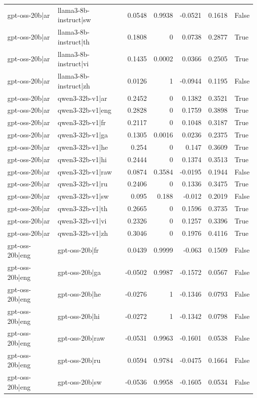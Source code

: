 \begin{table}
\begin{tabular}{l l r r r r l}
gpt-oss-20b|ar & llama3-8b-instruct|sw & 0.0548 & 0.9938 & -0.0521 & 0.1618 & False \\
gpt-oss-20b|ar & llama3-8b-instruct|th & 0.1808 & 0 & 0.0738 & 0.2877 & True \\
gpt-oss-20b|ar & llama3-8b-instruct|vi & 0.1435 & 0.0002 & 0.0366 & 0.2505 & True \\
gpt-oss-20b|ar & llama3-8b-instruct|zh & 0.0126 & 1 & -0.0944 & 0.1195 & False \\
gpt-oss-20b|ar & qwen3-32b-v1|ar & 0.2452 & 0 & 0.1382 & 0.3521 & True \\
gpt-oss-20b|ar & qwen3-32b-v1|eng & 0.2828 & 0 & 0.1759 & 0.3898 & True \\
gpt-oss-20b|ar & qwen3-32b-v1|fr & 0.2117 & 0 & 0.1048 & 0.3187 & True \\
gpt-oss-20b|ar & qwen3-32b-v1|ga & 0.1305 & 0.0016 & 0.0236 & 0.2375 & True \\
gpt-oss-20b|ar & qwen3-32b-v1|he & 0.254 & 0 & 0.147 & 0.3609 & True \\
gpt-oss-20b|ar & qwen3-32b-v1|hi & 0.2444 & 0 & 0.1374 & 0.3513 & True \\
gpt-oss-20b|ar & qwen3-32b-v1|raw & 0.0874 & 0.3584 & -0.0195 & 0.1944 & False \\
gpt-oss-20b|ar & qwen3-32b-v1|ru & 0.2406 & 0 & 0.1336 & 0.3475 & True \\
gpt-oss-20b|ar & qwen3-32b-v1|sw & 0.095 & 0.188 & -0.012 & 0.2019 & False \\
gpt-oss-20b|ar & qwen3-32b-v1|th & 0.2665 & 0 & 0.1596 & 0.3735 & True \\
gpt-oss-20b|ar & qwen3-32b-v1|vi & 0.2326 & 0 & 0.1257 & 0.3396 & True \\
gpt-oss-20b|ar & qwen3-32b-v1|zh & 0.3046 & 0 & 0.1976 & 0.4116 & True \\
gpt-oss-20b|eng & gpt-oss-20b|fr & 0.0439 & 0.9999 & -0.063 & 0.1509 & False \\
gpt-oss-20b|eng & gpt-oss-20b|ga & -0.0502 & 0.9987 & -0.1572 & 0.0567 & False \\
gpt-oss-20b|eng & gpt-oss-20b|he & -0.0276 & 1 & -0.1346 & 0.0793 & False \\
gpt-oss-20b|eng & gpt-oss-20b|hi & -0.0272 & 1 & -0.1342 & 0.0798 & False \\
gpt-oss-20b|eng & gpt-oss-20b|raw & -0.0531 & 0.9963 & -0.1601 & 0.0538 & False \\
gpt-oss-20b|eng & gpt-oss-20b|ru & 0.0594 & 0.9784 & -0.0475 & 0.1664 & False \\
gpt-oss-20b|eng & gpt-oss-20b|sw & -0.0536 & 0.9958 & -0.1605 & 0.0534 & False \\

\end{tabular}
\end{table}
